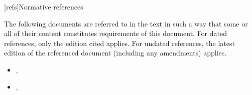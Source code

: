 
[refs]{Normative references}

\pnum
The following documents are referred to in the text in such a way that some or all of their content constitutes requirements of this document. For dated references, only the edition cited applies. For undated references, the latest edition of the referenced document (including any amendments) applies.

\begin{itemize}
\item {\cppstddocno}, 
\item {\cppconceptsdocno}, 
\end{itemize}

